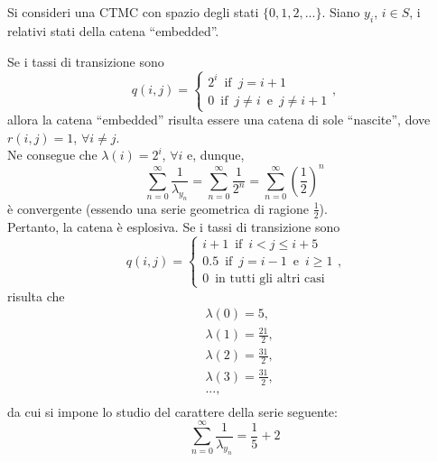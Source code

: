 \documentclass[11pt,largemargins]{homework}
\begin{document}
  \section{}%
  Si consideri una CTMC con spazio degli stati $\{0,1,2,...\}$. Siano $y_{i}$, $i\in S$, i relativi stati della catena ``embedded''.
  \begin{alphaparts}
  \questionpart
  Se i tassi di transizione sono
  \begin{equation*}
  q\left(i,j\right)=\begin{cases}2^{i} \,\,\,\text{if}\,\,\,j=i+1\\0 \,\,\,\text{if}\,\,\,j\neq i\,\,\,\text{e}\,\,\,j\neq i+1\end{cases},
  \end{equation*}
  allora la catena ``embedded'' risulta essere una catena di sole ``nascite'', dove $r\left(i,j\right)=1$, $\forall i \neq j$.\\
  Ne consegue che $\lambda\left(i\right)=2^{i}$, $\forall i$ e, dunque,
  \begin{equation*}
  \sum_{n=0}^{\infty}\frac{1}{\lambda_{y_{n}}}=\sum_{n=0}^{\infty}\frac{1}{2^{n}}=\sum_{n=0}^{\infty}\left(\frac{1}{2}\right)^{n}
  \end{equation*}
  è convergente (essendo una serie geometrica di ragione $\frac{1}{2}$).\\
  Pertanto, la catena è esplosiva.
  \questionpart
  Se i tassi di transizione sono
  \begin{equation*}
  q\left(i,j\right)=\begin{cases}i+1 \,\,\,\text{if}\,\,\,i<j\leq i+5\\0.5 \,\,\,\text{if}\,\,\,j=i-1\,\,\,\text{e}\,\,\,i\geq 1\\0 \,\,\, \text{in tutti gli altri casi}\end{cases},
  \end{equation*}
  risulta che
  \begin{align*}
&\lambda\left(0\right)= 5,\\
&\lambda\left(1\right)= \frac{21}{2},\\
&\lambda\left(2\right)= \frac{31}{2},\\
&\lambda\left(3\right)=\frac{31}{2},\\
&...,\\
\end{align*}
da cui si impone lo studio del carattere della serie seguente:
\begin{equation*}
\sum_{n=0}^{\infty}\frac{1}{\lambda_{y_{n}}}=\frac{1}{5}+2

\end{equation*}
\end{alphaparts}
\end{document}
